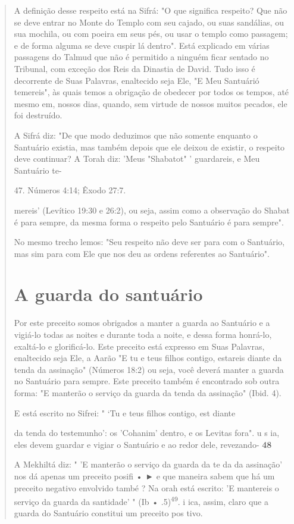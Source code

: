 \begin{quote}
A definição desse respeito está na Sifrá: "O que significa respeito? Que
não se deve entrar no Monte do Templo com seu cajado, ou suas
sandá­lias, ou sua mochila, ou com poeira em seus pés, ou usar o templo
como passa­gem; e de forma alguma se deve cuspir lá dentro". Está
explicado em várias passagens do Talmud que não é permitido a ninguém
ficar sentado no Tribu­nal, com exceção dos Reis da Dinastia de David.
Tudo isso é decorrente de Suas Palavras, enaltecido seja Ele, "E Meu
Santuárió temereis", às quais temos a obri­gação de obedecer por todos
os tempos, até mesmo em, nossos dias, quando, sem virtude de nossos
muitos pecados, ele foi destruído.

A Sifrá diz: "De que modo deduzimos que não somente enquanto o Santuário
existia, mas também depois que ele deixou de existir, o respeito deve
continuar? A Torah diz: 'Meus "Shabatot" ' guardareis, e Meu Santuário
te-

47. Números 4:14; Êxodo 27:7.

mereis' (Levítico 19:30 e 26:2), ou seja, assim como a observação do
Shabat é para sempre, da mesma forma o respeito pelo Santuário é para
sempre".

No mesmo trecho lemos: "Seu respeito não deve ser para com o San­tuário,
mas sim para com Ele que nos deu as ordens referentes ao Santuário".

\section{A guarda do santuário}

Por este preceito somos obrigados a manter a guarda ao Santuário e a
vigiá-lo todas as noites e durante toda a noite, e dessa forma honrá-lo,
exaltá-lo e glorificá-lo. Este preceito está expresso em Suas Palavras,
enaltecido seja Ele, a Aarão "E tu e teus filhos contigo, estareis
diante da tenda da assinação" (Nú­meros 18:2) ou seja, você deverá
manter a guarda no Santuário para sempre. Este preceito também é
encontrado sob outra forma: "E manterão o serviço da guarda da tenda da
assinação" (Ibid. 4).

E está escrito no Sifrei: " `Tu e teus filhos contigo, est diante

da tenda do testemunho': os 'Cohanim' dentro, e os Levitas fora". u s
ia, eles devem guardar e vigiar o Santuário e ao redor dele, revezando-
\textbf{48}

A Mekhiltá diz: " 'E manterão o serviço da guarda da te da da
assi­nação' nos dá apenas um preceito posifi • ► e que maneira sabem que
há um preceito negativo envolvido també ? Na orah está escrito: 'E
mantereis o serviço da guarda da santidade' " (Ib •
.5)\textsuperscript{49}. i ica, assim, claro que a guarda do Santuário
constitui um preceito pos tivo.


\end{quote}

